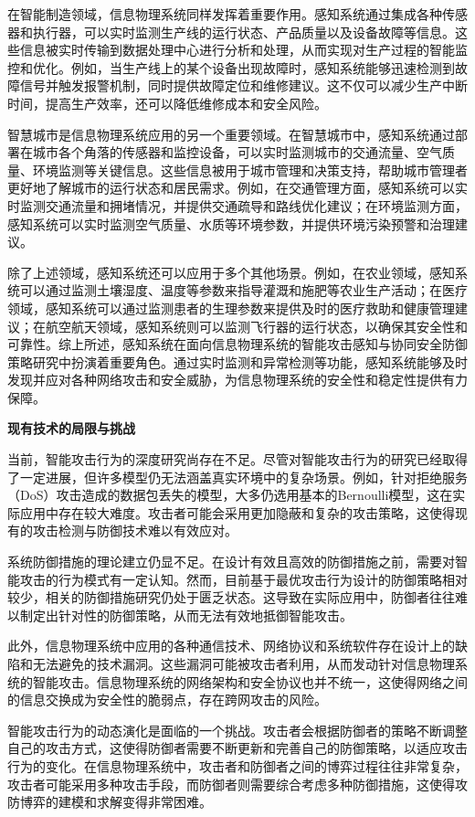 在智能制造领域，信息物理系统同样发挥着重要作用。感知系统通过集成各种传感器和执行器，可以实时监测生产线的运行状态、产品质量以及设备故障等信息。这些信息被实时传输到数据处理中心进行分析和处理，从而实现对生产过程的智能监控和优化。例如，当生产线上的某个设备出现故障时，感知系统能够迅速检测到故障信号并触发报警机制，同时提供故障定位和维修建议。这不仅可以减少生产中断时间，提高生产效率，还可以降低维修成本和安全风险。

智慧城市是信息物理系统应用的另一个重要领域。在智慧城市中，感知系统通过部署在城市各个角落的传感器和监控设备，可以实时监测城市的交通流量、空气质量、环境监测等关键信息。这些信息被用于城市管理和决策支持，帮助城市管理者更好地了解城市的运行状态和居民需求。例如，在交通管理方面，感知系统可以实时监测交通流量和拥堵情况，并提供交通疏导和路线优化建议；在环境监测方面，感知系统可以实时监测空气质量、水质等环境参数，并提供环境污染预警和治理建议。

除了上述领域，感知系统还可以应用于多个其他场景。例如，在农业领域，感知系统可以通过监测土壤湿度、温度等参数来指导灌溉和施肥等农业生产活动；在医疗领域，感知系统可以通过监测患者的生理参数来提供及时的医疗救助和健康管理建议；在航空航天领域，感知系统则可以监测飞行器的运行状态，以确保其安全性和可靠性。综上所述，感知系统在面向信息物理系统的智能攻击感知与协同安全防御策略研究中扮演着重要角色。通过实时监测和异常检测等功能，感知系统能够及时发现并应对各种网络攻击和安全威胁，为信息物理系统的安全性和稳定性提供有力保障。

\textbf{现有技术的局限与挑战}

当前，智能攻击行为的深度研究尚存在不足。尽管对智能攻击行为的研究已经取得了一定进展，但许多模型仍无法涵盖真实环境中的复杂场景。例如，针对拒绝服务（DoS）攻击造成的数据包丢失的模型，大多仍选用基本的Bernoulli模型，这在实际应用中存在较大难度。攻击者可能会采用更加隐蔽和复杂的攻击策略，这使得现有的攻击检测与防御技术难以有效应对。

系统防御措施的理论建立仍显不足。在设计有效且高效的防御措施之前，需要对智能攻击的行为模式有一定认知。然而，目前基于最优攻击行为设计的防御策略相对较少，相关的防御措施研究仍处于匮乏状态。这导致在实际应用中，防御者往往难以制定出针对性的防御策略，从而无法有效地抵御智能攻击。

此外，信息物理系统中应用的各种通信技术、网络协议和系统软件存在设计上的缺陷和无法避免的技术漏洞。这些漏洞可能被攻击者利用，从而发动针对信息物理系统的智能攻击。信息物理系统的网络架构和安全协议也并不统一，这使得网络之间的信息交换成为安全性的脆弱点，存在跨网攻击的风险。

智能攻击行为的动态演化是面临的一个挑战。攻击者会根据防御者的策略不断调整自己的攻击方式，这使得防御者需要不断更新和完善自己的防御策略，以适应攻击行为的变化。在信息物理系统中，攻击者和防御者之间的博弈过程往往非常复杂，攻击者可能采用多种攻击手段，而防御者则需要综合考虑多种防御措施，这使得攻防博弈的建模和求解变得非常困难。

